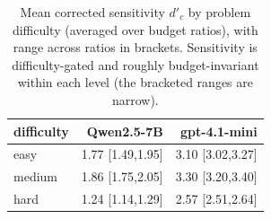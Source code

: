 \begin{table}[t]
\centering
\caption{Mean corrected sensitivity $d'_c$ by problem difficulty (averaged over budget ratios), with range across ratios in brackets. Sensitivity is difficulty-gated and roughly budget-invariant within each level (the bracketed ranges are narrow).}
\label{tab:dprime_difficulty}
\begin{tabular}{lrr}
\toprule
difficulty & Qwen2.5-7B & gpt-4.1-mini \\
\midrule
easy & 1.77 [1.49,1.95] & 3.10 [3.02,3.27] \\
medium & 1.86 [1.75,2.05] & 3.30 [3.20,3.40] \\
hard & 1.24 [1.14,1.29] & 2.57 [2.51,2.64] \\
\bottomrule
\end{tabular}
\end{table}
